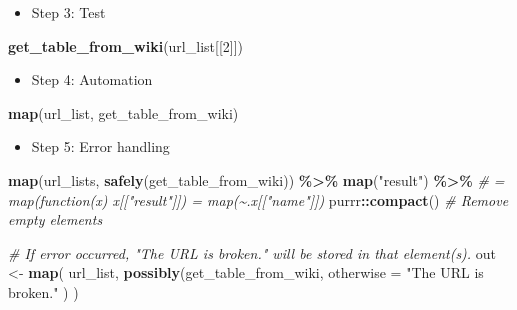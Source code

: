 \documentclass[
]{book}
\newenvironment{Shaded}{\begin{snugshade}}{\end{snugshade}}
\newcommand{\AttributeTok}[1]{\textcolor[rgb]{0.13,0.29,0.53}{#1}}
\newcommand{\CommentTok}[1]{\textcolor[rgb]{0.56,0.35,0.01}{\textit{#1}}}
\newcommand{\DecValTok}[1]{\textcolor[rgb]{0.00,0.00,0.81}{#1}}
\newcommand{\FunctionTok}[1]{\textcolor[rgb]{0.13,0.29,0.53}{\textbf{#1}}}
\newcommand{\NormalTok}[1]{#1}
\newcommand{\OtherTok}[1]{\textcolor[rgb]{0.56,0.35,0.01}{#1}}
\newcommand{\SpecialCharTok}[1]{\textcolor[rgb]{0.81,0.36,0.00}{\textbf{#1}}}
\newcommand{\StringTok}[1]{\textcolor[rgb]{0.31,0.60,0.02}{#1}}
\providecommand{\tightlist}{%
  \setlength{\itemsep}{0pt}\setlength{\parskip}{0pt}}
\begin{document}
\begin{itemize}
\tightlist
\item
  Step 3: Test
\end{itemize}

\begin{Shaded}
\begin{Highlighting}[]
\FunctionTok{get\_table\_from\_wiki}\NormalTok{(url\_list[[}\DecValTok{2}\NormalTok{]])}
\end{Highlighting}
\end{Shaded}

\begin{itemize}
\tightlist
\item
  Step 4: Automation
\end{itemize}

\begin{Shaded}
\begin{Highlighting}[]
\FunctionTok{map}\NormalTok{(url\_list, get\_table\_from\_wiki)}
\end{Highlighting}
\end{Shaded}

\begin{itemize}
\tightlist
\item
  Step 5: Error handling
\end{itemize}

\begin{Shaded}
\begin{Highlighting}[]
\FunctionTok{map}\NormalTok{(url\_lists, }\FunctionTok{safely}\NormalTok{(get\_table\_from\_wiki)) }\SpecialCharTok{\%\textgreater{}\%}
  \FunctionTok{map}\NormalTok{(}\StringTok{"result"}\NormalTok{) }\SpecialCharTok{\%\textgreater{}\%} 
  \CommentTok{\# = map(function(x) x[["result"]]) = map(\textasciitilde{}.x[["name"]])}
\NormalTok{  purrr}\SpecialCharTok{::}\FunctionTok{compact}\NormalTok{() }\CommentTok{\# Remove empty elements}
\end{Highlighting}
\end{Shaded}

\begin{Shaded}
\begin{Highlighting}[]
\CommentTok{\# If error occurred, "The URL is broken." will be stored in that element(s).}
\NormalTok{out }\OtherTok{\textless{}{-}} \FunctionTok{map}\NormalTok{(}
\NormalTok{  url\_list,}
  \FunctionTok{possibly}\NormalTok{(get\_table\_from\_wiki,}
    \AttributeTok{otherwise =} \StringTok{"The URL is broken."}
\NormalTok{  )}
\NormalTok{)}
\end{Highlighting}
\end{Shaded}
\end{document}
